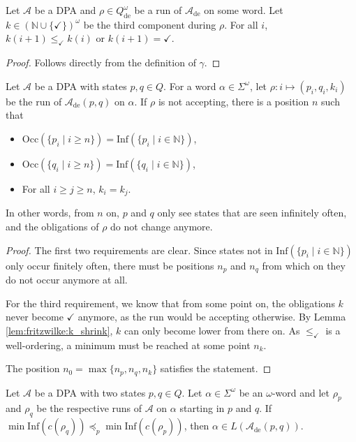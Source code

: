 \begin{lem}
\label{lem:fritzwilke:k_shrink}
	Let $\mathcal{A}$ be a DPA and $\rho \in Q_\text{de}^\omega$ be a run of $\mathcal{A}_\text{de}$ on some word. Let $k \in (\mathbb{N} \cup \{\checkmark\})^\omega$ be the third component during $\rho$. For all $i$, $k(i+1) \leq_\checkmark k(i)$ or $k(i+1) = \checkmark$.
\end{lem}

\begin{proof}
	Follows directly from the definition of $\gamma$.
\end{proof}

\begin{lem}
\label{lem:fritzwilke:n0_exists}
	Let $\mathcal{A}$ be a DPA with states $p, q \in Q$. For a word $\alpha \in \Sigma^\omega$, let $\rho : i \mapsto (p_i, q_i, k_i)$ be the run of $\mathcal{A}_\text{de}(p, q)$ on $\alpha$. If $\rho$ is not accepting, there is a position $n$ such that
	\begin{itemize}
		\item $\text{Occ}(\{p_i \mid i \geq n\}) = \text{Inf}(\{p_i \mid i \in \mathbb{N}\})$,
		\item $\text{Occ}(\{q_i \mid i \geq n\}) = \text{Inf}(\{q_i \mid i \in \mathbb{N}\})$,
		\item For all $i \geq j \geq n$, $k_i = k_j$.
	\end{itemize}
	
	In other words, from $n$ on, $p$ and $q$ only see states that are seen infinitely often, and the obligations of $\rho$ do not change anymore.
\end{lem}

\begin{proof}
	The first two requirements are clear. Since states not in $\text{Inf}(\{p_i \mid i \in \mathbb{N}\})$ only occur finitely often, there must be positions $n_p$ and $n_q$ from which on they do not occur anymore at all.
	
	For the third requirement, we know that from some point on, the obligations $k$ never become $\checkmark$ anymore, as the run would be accepting otherwise. By Lemma \ref{lem:fritzwilke:k_shrink}, $k$ can only become lower from there on. As $\leq_\checkmark$ is a well-ordering, a minimum must be reached at some point $n_k$.
	
	The position $n_0 = \max \{n_p, n_q, n_k\}$ satisfies the statement.
\end{proof}

\begin{lem}
\label{lem:fritzwilke:run_goodness_implies_de}
	Let $\mathcal{A}$ be a DPA with two states $p, q \in Q$. Let $\alpha \in \Sigma^\omega$ be an $\omega$-word and let $\rho_p$ and $\rho_q$ be the respective runs of $\mathcal{A}$ on $\alpha$ starting in $p$ and $q$. If $\min \text{Inf}(c(\rho_q)) \preceq_p \min \text{Inf}(c(\rho_p))$, then $\alpha \in L(\mathcal{A}_\text{de}(p, q))$.
\end{lem}

